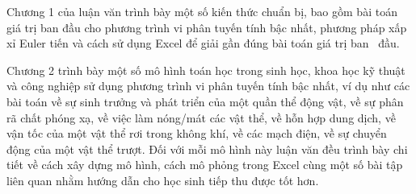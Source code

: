 Chương 1 của luận văn trình bày một số kiến thức chuẩn bị, bao gồm bài toán giá trị ban đầu cho phương trình vi phân tuyến tính bậc nhất, phương pháp xấp xỉ Euler tiến và cách sử dụng Excel để giải gần đúng bài toán giá trị ban~ đầu. 

Chương 2 trình bày một số mô hình toán học trong sinh học, khoa học kỹ thuật và công nghiệp sử dụng phương trình vi phân tuyến tính bậc nhất, ví dụ như các bài toán về sự sinh trưởng và phát triển của một quần thể động vật, về sự phân rã chất phóng xạ, về việc làm nóng/mát các vật thể, về hỗn hợp dung dịch, về vận tốc của một vật thể rơi trong không khí, về các mạch điện, về sự chuyển động của một vật thể trượt. Đối với mỗi mô hình này luận văn đều trình bày chi tiết về cách xây dựng mô hình, cách mô phỏng trong Excel cùng một số bài tập liên quan nhằm hướng dẫn cho học sinh tiếp thu được tốt hơn. 